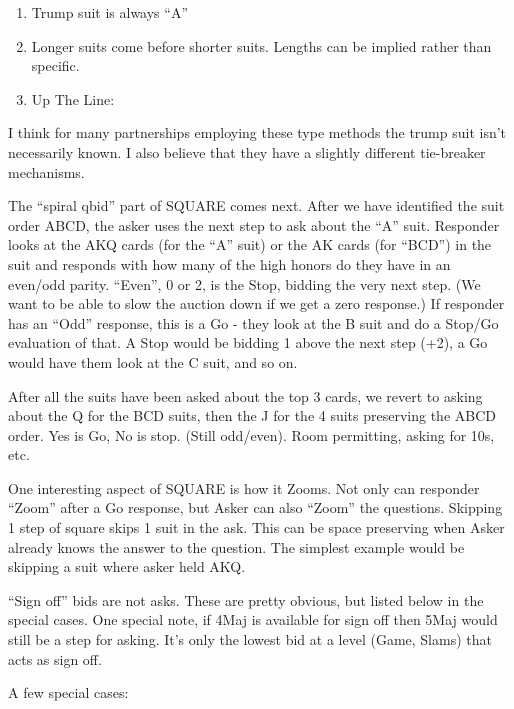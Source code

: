 \documentclass[tom-ari]{subfile}
\begin{document}
\begin{enumerate}
	\item Trump suit is always ``A''
	\item Longer suits come before shorter suits. Lengths can be implied rather than specific.
	\item Up The Line: \ccc \ddd \hhh \sss
\end{enumerate}

I think for many partnerships employing these type methods the trump suit isn't necessarily known.  I also believe that they have a slightly different tie-breaker mechanisms.  

The ``spiral qbid'' part of SQUARE comes next.  After we have identified the suit order ABCD, the asker uses the next step to ask about the ``A'' suit.  Responder looks at the AKQ cards (for the ``A'' suit) or the AK cards (for ``BCD'') in the suit and responds with how many of the high honors do they have in an even/odd parity.  ``Even'', 0 or 2, is the Stop, bidding the very next step.  (We want to be able to slow the auction down if we get a zero response.)  If responder has an ``Odd'' response, this is a Go - they look at the B suit and do a Stop/Go evaluation of that.  A Stop would be bidding 1 above the next step (+2), a Go would have them look at the C suit, and so on.

After all the suits have been asked about the top 3 cards, we revert to asking about the Q for the BCD suits, then the J for the 4 suits preserving the ABCD order.  Yes is Go, No is stop.  (Still odd/even).  Room permitting, asking for 10s, etc.

One interesting aspect of SQUARE is how it Zooms.  Not only can responder ``Zoom'' after a Go response, but Asker can also ``Zoom'' the questions.  Skipping 1 step of square skips 1 suit in the ask.  This can be space preserving when Asker already knows the answer to the question.  The simplest example would be skipping a suit where asker held AKQ.

``Sign off'' bids are not asks. These are pretty obvious, but listed below in the special cases.  One special note, if 4Maj is available for sign off then 5Maj would still be a step for asking.  It's only the lowest bid at a level (Game, Slams) that acts as sign off.

A few special cases:  
\end{document}
